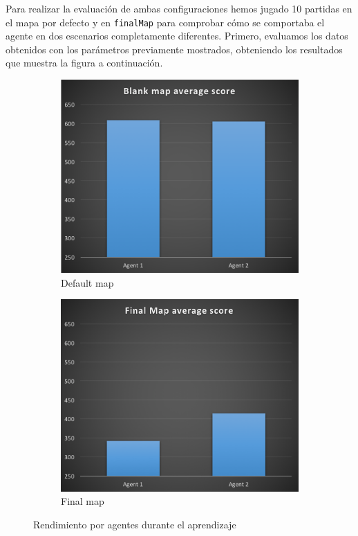 \documentclass[12pt]{article}
\begin{document}
Para realizar la evaluación de ambas configuraciones hemos jugado 10 partidas en el mapa por defecto y en \texttt{finalMap} para comprobar cómo se comportaba el agente en dos escenarios completamente diferentes. Primero, evaluamos los datos obtenidos con los parámetros previamente mostrados, obteniendo los resultados que muestra la figura a continuación.

\begin{figure}[h]
    \centering
    \begin{subfigure}{.5\textwidth}
        \centering
        \includegraphics[width=.7\linewidth]{bmap_a}
        \caption{Default map}
        \label{fig:sub1}
    \end{subfigure}%
    \begin{subfigure}{.5\textwidth}
        \centering
        \includegraphics[width=.7\linewidth]{fmap_a}
        \caption{Final map}
        \label{fig:sub2}
    \end{subfigure}
    \caption{Rendimiento por agentes durante el aprendizaje}
    \label{fig:test}
\end{figure}
\end{document}

